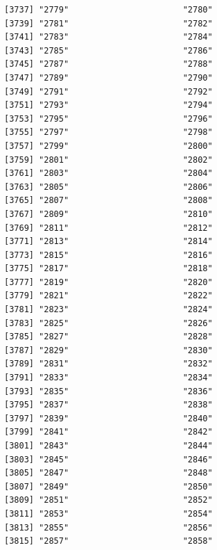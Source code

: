 \documentclass[
  letterpaper,
  DIV=11,
  numbers=noendperiod]{scrreprt}
\begin{document}
\begin{verbatim}
[3737] "2779"                       "2780"                      
[3739] "2781"                       "2782"                      
[3741] "2783"                       "2784"                      
[3743] "2785"                       "2786"                      
[3745] "2787"                       "2788"                      
[3747] "2789"                       "2790"                      
[3749] "2791"                       "2792"                      
[3751] "2793"                       "2794"                      
[3753] "2795"                       "2796"                      
[3755] "2797"                       "2798"                      
[3757] "2799"                       "2800"                      
[3759] "2801"                       "2802"                      
[3761] "2803"                       "2804"                      
[3763] "2805"                       "2806"                      
[3765] "2807"                       "2808"                      
[3767] "2809"                       "2810"                      
[3769] "2811"                       "2812"                      
[3771] "2813"                       "2814"                      
[3773] "2815"                       "2816"                      
[3775] "2817"                       "2818"                      
[3777] "2819"                       "2820"                      
[3779] "2821"                       "2822"                      
[3781] "2823"                       "2824"                      
[3783] "2825"                       "2826"                      
[3785] "2827"                       "2828"                      
[3787] "2829"                       "2830"                      
[3789] "2831"                       "2832"                      
[3791] "2833"                       "2834"                      
[3793] "2835"                       "2836"                      
[3795] "2837"                       "2838"                      
[3797] "2839"                       "2840"                      
[3799] "2841"                       "2842"                      
[3801] "2843"                       "2844"                      
[3803] "2845"                       "2846"                      
[3805] "2847"                       "2848"                      
[3807] "2849"                       "2850"                      
[3809] "2851"                       "2852"                      
[3811] "2853"                       "2854"                      
[3813] "2855"                       "2856"                      
[3815] "2857"                       "2858"                      

\end{verbatim}
\end{document}
